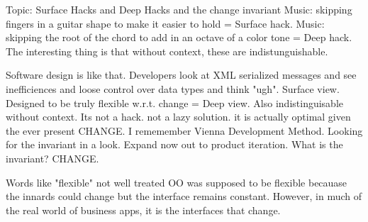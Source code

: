 	Topic: Surface Hacks and Deep Hacks and the change invariant
		Music: skipping fingers in a guitar shape to make it easier to hold = Surface hack.
		Music: skipping the root of the chord to add in an octave of a color tone = Deep hack.
		The interesting thing is that without context, these are indistunguishable.
			
		Software design is like that. Developers look at XML serialized messages and see inefficiences and loose control over data types and think "ugh". Surface view.
		Designed to be truly flexible w.r.t. change = Deep view. Also indistinguisable without context. Its not a hack. not a lazy solution. it is actually optimal given
		the ever present CHANGE.
		I rememember Vienna Development Method. Looking for the invariant in a look. Expand now out to product iteration. What is the invariant? CHANGE.

		Words like "flexible" not well treated  OO was supposed to be flexible becauase the innards could change but the interface remains constant.
		However, in much of the real world of business apps, it is the interfaces that change.


